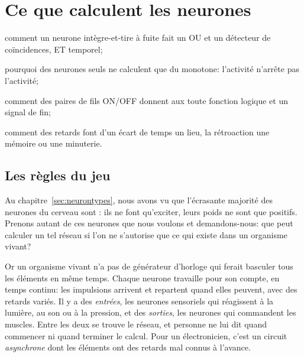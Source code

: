 \chapter{Ce que calculent les neurones }
\label{sec:glutcomputer}
\begin{chaptergoals}
\item comment un neurone intègre-et-tire à fuite fait un OU et un détecteur de coïncidences, ET temporel;
\item pourquoi des neurones  seuls ne calculent que du monotone: l'activité n'arrête pas l'activité;
\item comment des paires de fils ON/OFF donnent aux  toute fonction logique et un signal de fin;
\item comment des retards font d'un écart de temps un lieu, la rétroaction une mémoire ou une minuterie.
\end{chaptergoals}

\section{Les règles du jeu}

Au chapitre~\ref{sec:neurontypes}, nous avons vu que l'écrasante majorité des neurones du cerveau sont : ils ne font qu'exciter, leurs poids ne sont que positifs. Prenons autant de ces neurones que nous voulons et demandons-nous: que peut calculer un tel réseau si l'on ne s'autorise que ce qui existe dans un organisme vivant?

Or un organisme vivant n'a pas de générateur d'horloge qui ferait basculer tous les éléments en même temps. Chaque neurone travaille pour son compte, en temps continu: les impulsions arrivent et repartent quand elles peuvent, avec des retards variés. Il y a des \emph{entrées}, les neurones sensoriels qui réagissent à la lumière, au son ou à la pression, et des \emph{sorties}, les neurones qui commandent les muscles. Entre les deux se trouve le réseau, et personne ne lui dit quand commencer ni quand terminer le calcul. Pour un électronicien, c'est un circuit \emph{asynchrone} dont les éléments ont des retards mal connus à l'avance.

